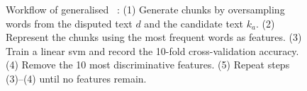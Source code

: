 \begin{figure}[htbp]
    \centering
    
    \caption[Generalised \unmasking{} workflow.]{Workflow of generalised \unmasking{}~\citep{bevendorff_generalizing_2019}: 
    (1) Generate chunks by oversampling words from the disputed text $d$ and the candidate text $k_a$. 
    (2) Represent the chunks using the most frequent words as features. 
    (3) Train a linear \ac{svm} and record the 10-fold cross-validation accuracy. 
    (4) Remove the 10 most discriminative features. 
    (5) Repeat steps (3)–(4) until no features remain.}
    \label{fig:generalized_unmasking}
\end{figure}
